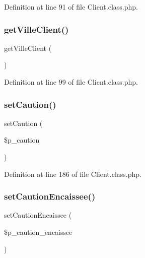 Definition at line 91 of file Client.\+class.\+php.

\mbox{\label{class_client_ab607203fb73662682b0eb68151842ef4}} 
\subsubsection{\texorpdfstring{get\+Ville\+Client()}{getVilleClient()}}
{\footnotesize\ttfamily get\+Ville\+Client (\begin{DoxyParamCaption}{ }\end{DoxyParamCaption})}



Definition at line 99 of file Client.\+class.\+php.

\mbox{\label{class_client_aa2f92cdad1e4db9596a3f5804cbe70e4}} 
\subsubsection{\texorpdfstring{set\+Caution()}{setCaution()}}
{\footnotesize\ttfamily set\+Caution (\begin{DoxyParamCaption}\item[{}]{\$p\+\_\+caution }\end{DoxyParamCaption})}



Definition at line 186 of file Client.\+class.\+php.

\mbox{\label{class_client_a11c434331e2518272593e8cec6ce53c9}} 
\subsubsection{\texorpdfstring{set\+Caution\+Encaissee()}{setCautionEncaissee()}}
{\footnotesize\ttfamily set\+Caution\+Encaissee (\begin{DoxyParamCaption}\item[{}]{\$p\+\_\+caution\+\_\+encaissee }\end{DoxyParamCaption})}



